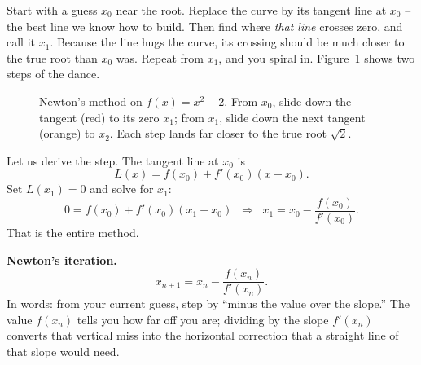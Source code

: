 Start with a guess $x_0$ near the root. Replace the curve by its tangent line at
$x_0$ -- the best line we know how to build. Then find where \emph{that line}
crosses zero, and call it $x_1$. Because the line hugs the curve, its crossing
should be much closer to the true root than $x_0$ was. Repeat from $x_1$, and you
spiral in. Figure~\ref{ch14:fig-newton} shows two steps of the dance.

\begin{figure}[H]
\centering
{}
\caption{Newton's method on $f(x)=x^2-2$. From $x_0$, slide down the tangent
(red) to its zero $x_1$; from $x_1$, slide down the next tangent (orange) to
$x_2$. Each step lands far closer to the true root $\sqrt 2$.}
\label{ch14:fig-newton}
\end{figure}

Let us derive the step. The tangent line at $x_0$ is
\[
L(x) = f(x_0) + f'(x_0)(x - x_0).
\]
Set $L(x_1)=0$ and solve for $x_1$:
\[
0 = f(x_0) + f'(x_0)(x_1 - x_0)
\;\;\Longrightarrow\;\;
x_1 = x_0 - \frac{f(x_0)}{f'(x_0)}.
\]
That is the entire method.

\begin{focusbox}
\textbf{Newton's iteration.}
\[
x_{n+1} = x_n - \frac{f(x_n)}{f'(x_n)}.
\]
In words: from your current guess, step by ``minus the value over the slope.''
The value $f(x_n)$ tells you how far off you are; dividing by the slope
$f'(x_n)$ converts that vertical miss into the horizontal correction that a
straight line of that slope would need.
\end{focusbox}

